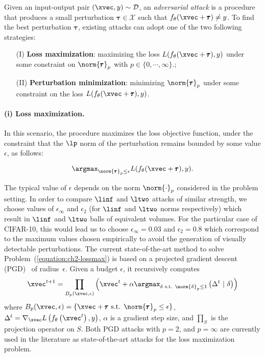 Given an input-output pair $(\xvec, y) \sim \mathcal{D}$, an \emph{adversarial attack} is a procedure that produces a small perturbation $\pmb{\tau} \in  \mathcal X$  such that $f_\theta(\xvec + \pmb{\tau}) \neq y$.
To find the best perturbation $\pmb{\tau}$, existing attacks can adopt one of the two following strategies:
\begin{itemize}
  \item[(I)] \textbf{Loss maximization}: maximizing the loss $L(f_\theta(\xvec + \pmb{\tau}), y)$ under some constraint on $\norm{\pmb{\tau}}_p$ with $p \in \{0, \cdots, \infty\}$.;
  \item[(II)] \textbf{Perturbation minimization}: minimizing $\norm{\pmb{\tau}}_p$ under some constraint on the loss $L(f_\theta(\xvec + \pmb{\tau}), y)$.
\end{itemize}

\paragraph{(i) Loss maximization.}
In this scenario, the procedure maximizes the loss objective function, under the constraint that the $\lp$ norm of the perturbation remains bounded by some value $\epsilon$, as follows:  

\begin{equation}
  \argmax_{\norm{\pmb{\tau}}_p \leq \epsilon} L(f_\theta(\xvec + \pmb{\tau}),y).
  \label{equation:ch2-lossmax}
\end{equation}

The typical value of $\epsilon$ depends on the norm $\norm{\cdot}_p$ considered in the problem setting.
In order to compare $\linf$ and $\ltwo$ attacks of similar strength, we choose values of $\epsilon_\infty$ and $\epsilon_2$ (for $\linf$ and $\ltwo$ norms respectively) which result in $\linf$ and $\ltwo$ balls of equivalent volumes.
For the particular case of CIFAR-10, this would lead us to choose $\epsilon_\infty = 0.03$ and $\epsilon_2 = 0.8$ which correspond to the maximum values chosen empirically to avoid the generation of visually detectable perturbations. 
The current state-of-the-art method to solve Problem~(\ref{equation:ch2-lossmax}) is based on a projected gradient descent (PGD)~\cite{madry2018towards} of radius~$\epsilon$. Given a budget $\epsilon$, it recursively computes
\begin{equation}
    \xvec^{t+1}=\prod_{B_p(\xvec,\epsilon)}\left(\xvec^t
    +\alpha \argmax_{\delta \text{ s.t. } \norm{\delta}_p \leq 1} \left( \Delta^t \ |\ \delta \right)\right)
    \label{equation:ch2-projectionPGD}
\end{equation}
where $B_p(\xvec,\epsilon) = \{ \xvec + \pmb{\tau} \text{ s.t. } \norm{\pmb{\tau}}_p \leq \epsilon\}$, $\Delta^t = \nabla_\xvec L\left( f_\theta \left(\xvec^t \right), y \right)$, $\alpha$ is a gradient step size, and $\prod_S$ is the projection operator on $S$. Both PGD attacks with $p=2$, and $p=\infty$ are currently used in the literature as state-of-the-art attacks for the loss maximization problem. 


